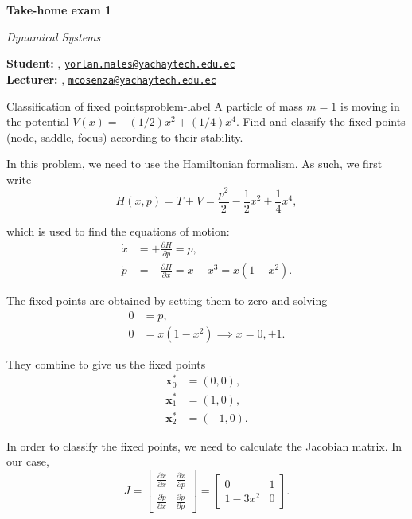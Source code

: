 





\textsf{\LARGE{\textbf{Take-home exam 1}}}

\normalsize{\textit{Dynamical Systems}}

\vspace{1ex}

\textsf{\textbf{Student:}} , 
\href{mailto:yorlan.males@yachaytech.edu.ec}{\texttt{yorlan.males@yachaytech.edu.ec}}\\
\textsf{\textbf{Lecturer:}} , 
\href{mcosenza@yachaytech.edu.ec}{\texttt{mcosenza@yachaytech.edu.ec}}

\vspace{2ex}

\begin{problem}{Classification of fixed points}{problem-label}
A particle of mass $m = 1$ is moving in the potential $V(x) = - (1/2)x^2 + (1/4)x^4$.
Find and classify the fixed points (node, saddle, focus) according to their stability.
\end{problem}

In this problem, we need to use the Hamiltonian formalism.
As such, we first write
\[
    \label{eq:hamiltonian}
    H(x, p) = T + V = \frac{p^2}{2} - \frac{1}{2}x^2 + \frac{1}{4}x^4,
\]

which is used to find the equations of motion:
\[
    \label{eq:hamiltonian_eqs}
    \begin{aligned}
        \dot{x} &= +\frac{\partial H}{\partial p} = p,\\
        \dot{p} &= -\frac{\partial H}{\partial x} = x - x^3 = x(1 - x^2).
    \end{aligned}
\]

The fixed points are obtained by setting them to zero and
solving
\[
    \begin{aligned}
        0 &= p,\\
        0 &= x(1 - x^2) \implies x = 0, \pm 1.
    \end{aligned}
\]

They combine to give us the fixed points
\[
    \begin{aligned}
        \textbf{x}_0^* &= (0, 0),\\
        \textbf{x}_1^* &= (1, 0),\\
        \textbf{x}_2^* &= (-1, 0).
    \end{aligned}
\]

In order to classify the fixed points, we need to 
calculate the Jacobian matrix. In our case,
\[
    J = \begin{bmatrix}
        \displaystyle\frac{\partial \dot{x}}{\partial x} & \displaystyle\frac{\partial \dot{x}}{\partial p}\\[2.5ex]
        \displaystyle\frac{\partial \dot{p}}{\partial x} & \displaystyle\frac{\partial \dot{p}}{\partial p}
    \end{bmatrix} =
    \begin{bmatrix}
        0 & 1\\
        1 - 3x^2 & 0
    \end{bmatrix}.
\]

